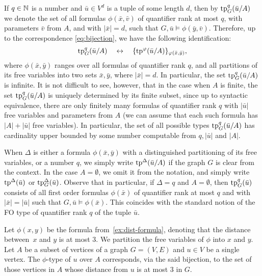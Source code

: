 If $q\in \mathbb{N}$ is a number and $\bar u\in  V^{d}$
is a tuple of some length $d$, then by $\mathrm{tp}^q_G(\bar u/A)$  we denote the set of all formulas $\phi(\bar x,\bar v)$
of quantifier rank at most $q$, with parameters $\bar v$ from $A$, and with $|\bar x|=d$,
such that $G,\bar u\models \phi(\bar y,\bar v)$.
Therefore, up to the correspondence \eqref{eq:bijection}, we have the following identification:
\begin{equation*}
\mathrm{tp}^q_G(\bar u/A)\quad\leftrightarrow\quad\{\mathrm{tp}^\varphi(\bar u/A)\}_{\varphi(\bar x,\bar y)},
\end{equation*}
where $\phi(\bar x,\bar y)$ ranges over all formulas of quantifier rank $q$, and all partitions of its free variables into two sets $\bar x,\bar y$,
where $|\bar x|=d$. 
In particular, the set $\mathrm{tp}^q_G(\bar u/A)$ is infinite.
It is not difficult to see, however, that in the case when $A$ is finite,
the set $\mathrm{tp}^q_G(\bar u/A)$ is uniquely determined by its finite subset, since up to syntactic equivalence, 
there are only finitely many formulas of quantifier rank $q$ with $|\bar u|$ free variables and parameters from $A$
(we can assume that each such formula has $|A|+|\bar u|$ free variables).
In particular, the set of all possible types 
$\mathrm{tp}^q_G(\bar u/A)$ has cardinality upper bounded by some number 
 computable from $q,|\bar u|$ and $|A|$.

When $\Delta$ is either a formula $\phi(\bar x,\bar y)$ with a distinguished partitioning of its free variables, or a number $q$,
we simply write $\mathrm{tp}^\Delta(\bar u/A)$ if the graph $G$
is clear from the context.
In the case $A=\emptyset$, we omit it from the notation, 
and simply write $\mathrm{tp}^\Delta(\bar u)$ or $\mathrm{tp}^\Delta_G(\bar u)$.
Observe that in particular, if $\Delta=q$ and $A=\emptyset$, then $\mathrm{tp}^q_G(\bar u)$ consists of all first order formulas $\phi(\bar x)$ of quantifier rank at most $q$ and with $|\bar x|=|\bar u|$
such that $G,\bar u\models \phi(\bar x)$. This coincides with the standard notion of the FO type of quantifier rank $q$ of the tuple $\bar u$.

\begin{example}
Let $\phi(x,y)$	be the formula from~\cref{ex:dist-formula}, denoting that the distance between~$x$ and $y$ is at most $3$.
We  partition  the free variables of $\phi$
into $x$ and $y$.
Let $A$ be a subset of vertices of a graph $G=(V,E)$
and $u\in V$ be a single vertex.
The $\phi$-type of $u$ over $A$
corresponds, via the said bijection, to the set of those vertices in $A$
whose distance from $u$ is at most $3$ in $G$.
\end{example}

